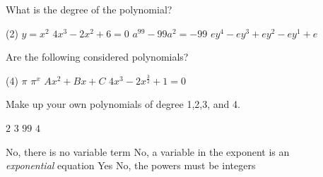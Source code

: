 \begin{Exercise}[title={Polynomials},label=ex13]
	\Question What is the degree of the polynomial?
	\begin{tasks}(2)
		\task 	 $y=x^2$%
		\task    $4x^3-2x^2+6=0$%
		\task 	 $a^{99}-99a^2=-99$%
		\task    $ey^4- ey^3+ ey^2-ey^1+e$%
	\end{tasks}
	
	\Question Are the following considered polynomials?
	\begin{tasks}(4)
		\task 	 $\pi$%
		\task 	 $\pi^x$%
		\task    $Ax^2+Bx+C$%
		\task    $4x^3-2x^{\frac{3}{2}}+1=0$%
	\end{tasks}

	\Question Make up your own polynomials of degree 1,2,3, and 4.
\end{Exercise}%
\begin{Answer}	[ref={ex13}]
	\Question %
\begin{tasks}
	\task 	 $2$
	\task    $3$
	\task 	 $99$
	\task    $4$
\end{tasks}

\Question %
\begin{tasks}
	\task 	 No, there is no variable term
	\task 	 No, a variable in the exponent is an \\\textit{exponential} equation
	\task    Yes
	\task    No, the powers must be integers
\end{tasks}

\end{Answer}%
	
